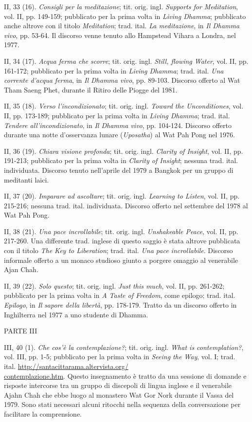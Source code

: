 II, 33 (16). \emph{Consigli per la meditazione}; tit. orig. ingl.
\emph{Supports for Meditation}, vol. II, pp. 149-159; pubblicato per la
prima volta in \emph{Living Dhamma}; pubblicato anche altrove con il
titolo \emph{Meditation}; trad. ital. \emph{La meditazione}, in \emph{Il
Dhamma vivo}, pp. 53-64. Il discorso venne tenuto allo Hampstead Vihara
a Londra, nel 1977.

II, 34 (17). \emph{Acqua ferma che scorre}; tit. orig. ingl.
\emph{Still, flowing Water}, vol. II, pp. 161-172; pubblicato per la
prima volta in \emph{Living Dhamma}; trad. ital. \emph{Una corrente
d'acqua ferma}, in \emph{Il Dhamma vivo}, pp. 89-103. Discorso offerto
al Wat Tham Saeng Phet, durante il Ritiro delle Piogge del 1981.

II, 35 (18). \emph{Verso l'incondizionato}; tit. orig. ingl.
\emph{Toward the Unconditiones}, vol. II, pp. 173-189; pubblicato per la
prima volta in \emph{Living Dhamma}; trad. ital. \emph{Tendere
all'incondizionato}, in \emph{Il Dhamma vivo}, pp. 104-124. Discorso
offerto durante una notte d'osservanza lunare (\emph{Uposatha}) al Wat
Pah Pong nel 1976.

II, 36 (19). \emph{Chiara visione profonda}; tit. orig. ingl.
\emph{Clarity of Insight}, vol. II, pp. 191-213; pubblicato per la prima
volta in \emph{Clarity of Insight}; nessuna trad. ital. individuata.
Discorso tenuto nell'aprile del 1979 a Bangkok per un gruppo di
meditanti laici.

II, 37 (20). \emph{Imparare ad ascoltare}; tit. orig. ingl.
\emph{Learning to Listen}, vol. II, pp. 215-216; nessuna trad. ital.
individuata. Discorso offerto nel settembre del 1978 al Wat Pah Pong.

II, 38 (21). \emph{Una pace incrollabile}; tit. orig. ingl.
\emph{Unshakeable Peace}, vol. II, pp. 217-260. Una differente trad.
inglese di questo saggio è stata altrove pubblicata con il titolo
\emph{The Key to Liberation}; trad. ital. \emph{Una pace incrollabile}.
Discorso informale offerto a un monaco studioso giunto a porgere omaggio
al venerabile Ajan Chah.

II, 39 (22). \emph{Solo questo}; tit. orig. ingl. \emph{Just this much},
vol. II, pp. 261-262; pubblicato per la prima volta in \emph{A Taste of
Freedom}, come epilogo; trad. ital. \emph{Epilogo}, in \emph{Il}
\emph{sapore della libertà}, pp. 178-179. Tratto da un discorso offerto
in Inghilterra nel 1977 a uno studente di Dhamma.

PARTE III

III, 40 (1). \emph{Che cos'è la contemplazione?}; tit. orig. ingl.
\emph{What is contemplation?}, vol. III, pp. 1-5; pubblicato per la
prima volta in \emph{Seeing the Way}, vol. I; trad. ital.
\href{http://santacittarama.altervista.org/contemplazione.htm}{http://santacittarama.altervista.org/\\
contemplazione.htm}. Questo insegnamento è tratto da una sessione di
domande e risposte intercorse tra un gruppo di discepoli di lingua
inglese e il venerabile Ajahn Chah che ebbe luogo al monastero Wat Gor
Nork durante il Vassa del 1979. Sono stati necessari alcuni ritocchi
nella sequenza della conversazione per facilitare la comprensione.

